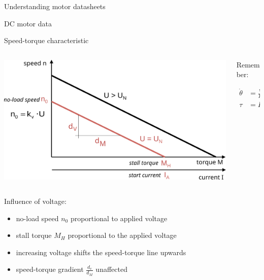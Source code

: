 \documentclass[compress]{beamer}
\begin{document}
{
    \begin{frame}{Understanding motor datasheets}
    \end{frame}
}

{
    \begin{frame}{DC motor data}
    \end{frame}
}

\begin{frame}{Speed-torque characteristic}

    \begin{columns}
        \begin{column}{0.7\linewidth}
    \begin{center}
        \includegraphics[width=\linewidth]{voltage-torque}
    \end{center}


        \end{column}
        \begin{column}{0.3\linewidth}
            Remember:

    \begin{align*}
        \dot\theta &= \frac{V}{K} - R \cdot \frac{\tau}{K^2} \\
        \tau &= K \cdot I
    \end{align*}

        \end{column}
    \end{columns}

    \pause
    Influence of voltage:

    \begin{itemize}
            \small
        \item no-load speed $n_0$ proportional to applied voltage
        \item stall torque $M_H$ proportional to the applied voltage
        \item increasing voltage shifts the speed-torque line upwards
        \item speed-torque gradient $\frac{d_v}{d_M}$ unaffected
    \end{itemize}


\end{frame}
\end{document}
